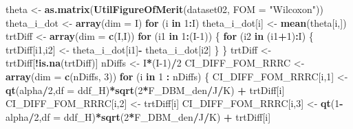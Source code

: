 \documentclass[
]{book}
\newenvironment{Shaded}{\begin{snugshade}}{\end{snugshade}}
\newcommand{\ControlFlowTok}[1]{\textcolor[rgb]{0.13,0.29,0.53}{\textbf{#1}}}
\newcommand{\DataTypeTok}[1]{\textcolor[rgb]{0.13,0.29,0.53}{#1}}
\newcommand{\DecValTok}[1]{\textcolor[rgb]{0.00,0.00,0.81}{#1}}
\newcommand{\KeywordTok}[1]{\textcolor[rgb]{0.13,0.29,0.53}{\textbf{#1}}}
\newcommand{\NormalTok}[1]{#1}
\newcommand{\OperatorTok}[1]{\textcolor[rgb]{0.81,0.36,0.00}{\textbf{#1}}}
\newcommand{\StringTok}[1]{\textcolor[rgb]{0.31,0.60,0.02}{#1}}
\begin{document}
\begin{Shaded}
\begin{Highlighting}[]
\NormalTok{theta \textless{}{-}}\StringTok{ }\KeywordTok{as.matrix}\NormalTok{(}\KeywordTok{UtilFigureOfMerit}\NormalTok{(dataset02, }\DataTypeTok{FOM =} \StringTok{"Wilcoxon"}\NormalTok{))}
\NormalTok{theta\_i\_dot \textless{}{-}}\StringTok{ }\KeywordTok{array}\NormalTok{(}\DataTypeTok{dim =}\NormalTok{ I)}
\ControlFlowTok{for}\NormalTok{ (i }\ControlFlowTok{in} \DecValTok{1}\OperatorTok{:}\NormalTok{I) theta\_i\_dot[i] \textless{}{-}}\StringTok{ }\KeywordTok{mean}\NormalTok{(theta[i,])}
\NormalTok{trtDiff \textless{}{-}}\StringTok{ }\KeywordTok{array}\NormalTok{(}\DataTypeTok{dim =} \KeywordTok{c}\NormalTok{(I,I))}
\ControlFlowTok{for}\NormalTok{ (i1 }\ControlFlowTok{in} \DecValTok{1}\OperatorTok{:}\NormalTok{(I}\DecValTok{{-}1}\NormalTok{)) \{    }
  \ControlFlowTok{for}\NormalTok{ (i2 }\ControlFlowTok{in}\NormalTok{ (i1}\OperatorTok{+}\DecValTok{1}\NormalTok{)}\OperatorTok{:}\NormalTok{I) \{}
\NormalTok{    trtDiff[i1,i2] \textless{}{-}}\StringTok{ }\NormalTok{theta\_i\_dot[i1]}\OperatorTok{{-}}\StringTok{ }\NormalTok{theta\_i\_dot[i2]    }
\NormalTok{  \}}
\NormalTok{\}}
\NormalTok{trtDiff \textless{}{-}}\StringTok{ }\NormalTok{trtDiff[}\OperatorTok{!}\KeywordTok{is.na}\NormalTok{(trtDiff)]}
\NormalTok{nDiffs \textless{}{-}}\StringTok{ }\NormalTok{I}\OperatorTok{*}\NormalTok{(I}\DecValTok{{-}1}\NormalTok{)}\OperatorTok{/}\DecValTok{2}
\NormalTok{CI\_DIFF\_FOM\_RRRC \textless{}{-}}\StringTok{ }\KeywordTok{array}\NormalTok{(}\DataTypeTok{dim =} \KeywordTok{c}\NormalTok{(nDiffs, }\DecValTok{3}\NormalTok{))}
\ControlFlowTok{for}\NormalTok{ (i }\ControlFlowTok{in} \DecValTok{1} \OperatorTok{:}\StringTok{ }\NormalTok{nDiffs) \{}
\NormalTok{  CI\_DIFF\_FOM\_RRRC[i,}\DecValTok{1}\NormalTok{] \textless{}{-}}\StringTok{ }\KeywordTok{qt}\NormalTok{(alpha}\OperatorTok{/}\DecValTok{2}\NormalTok{,}\DataTypeTok{df =}\NormalTok{ ddf\_H)}\OperatorTok{*}\KeywordTok{sqrt}\NormalTok{(}\DecValTok{2}\OperatorTok{*}\NormalTok{F\_DBM\_den}\OperatorTok{/}\NormalTok{J}\OperatorTok{/}\NormalTok{K) }\OperatorTok{+}\StringTok{ }\NormalTok{trtDiff[i]}
\NormalTok{  CI\_DIFF\_FOM\_RRRC[i,}\DecValTok{2}\NormalTok{] \textless{}{-}}\StringTok{ }\NormalTok{trtDiff[i]}
\NormalTok{  CI\_DIFF\_FOM\_RRRC[i,}\DecValTok{3}\NormalTok{] \textless{}{-}}\StringTok{ }\KeywordTok{qt}\NormalTok{(}\DecValTok{1}\OperatorTok{{-}}\NormalTok{alpha}\OperatorTok{/}\DecValTok{2}\NormalTok{,}\DataTypeTok{df =}\NormalTok{ ddf\_H)}\OperatorTok{*}\KeywordTok{sqrt}\NormalTok{(}\DecValTok{2}\OperatorTok{*}\NormalTok{F\_DBM\_den}\OperatorTok{/}\NormalTok{J}\OperatorTok{/}\NormalTok{K) }\OperatorTok{+}\StringTok{ }\NormalTok{trtDiff[i]}

\end{Highlighting}
\end{Shaded}
\end{document}
